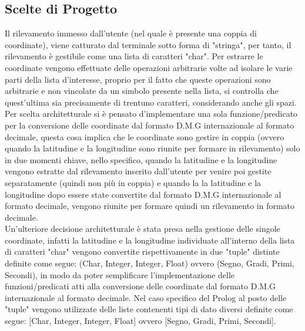 \documentclass{article}
\begin{document}
\subsection{Scelte di Progetto}
Il rilevamento immesso dall'utente (nel quale è presente una coppia di coordinate), viene catturato dal terminale sotto forma di "stringa", per tanto, il rilevamento è gestibile come una lista di caratteri "char". Per estrarre le coordinate vengono effettuate delle operazioni arbitrarie volte ad isolare le varie parti della lista d'interesse, proprio per il fatto che queste operazioni sono arbitrarie e  non vincolate da un simbolo presente nella lista, si controlla che quest'ultima sia precisamente di trentuno caratteri, considerando anche gli spazi.\\
Per scelta architetturale si è pensato d'implementare una sola funzione/predicato per la conversione delle coordinate dal formato D.M.G internazionale al formato decimale, questa cosa implica che le coordinate sono gestire in coppia (ovvero quando la latitudine e la longitudine sono riunite per formare in rilevamento) solo in due momenti chiave, nello specifico, quando la latitudine e la longitudine vengono estratte dal rilevamento inserito dall'utente per venire poi gestite separatamente (quindi non più in coppia) e quando la la latitudine e la longitudine dopo essere state convertite dal formato D.M.G internazionale al formato decimale, vengono riunite per formare quindi un rilevamento in formato decimale.\\
 Un'ulteriore decisione architetturale è stata presa nella gestione delle singole coordinate, infatti la latitudine e la longitudine individuate all'interno della lista di caratteri "char" vengono convertite rispettivamente in due "tuple" distinte definite come segue: (Char, Integer, Integer, Float) ovvero (Segno, Gradi, Primi, Secondi), in modo da poter semplificare l'implementazione delle funzioni/predicati atti alla conversione delle coordinate dal formato D.M.G internazionale al formato decimale. Nel caso specifico del Prolog al posto delle "tuple" vengono utilizzate delle liste contenenti tipi di dato diversi definite come segue: [Char, Integer, Integer, Float] ovvero [Segno, Gradi, Primi, Secondi].
 
\end{document}

